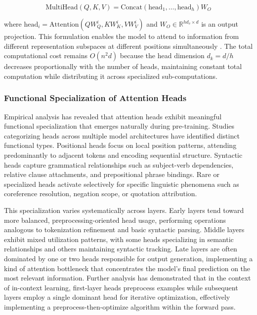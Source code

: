 \documentclass[11pt,letterpaper]{article}
\begin{document}
\begin{equation}
\text{MultiHead}(Q, K, V) = \text{Concat}(\text{head}_1, \ldots, \text{head}_h) W_O
\end{equation}

where $\text{head}_i = \text{Attention}(QW_Q^i, KW_K^i, VW_V^i)$ and $W_O \in \mathbb{R}^{hd_v \times d}$ is an output projection. This formulation enables the model to attend to information from different representation subspaces at different positions simultaneously \cite{vaswani2017attention}. The total computational cost remains $O(n^2 d)$ because the head dimension $d_k = d/h$ decreases proportionally with the number of heads, maintaining constant total computation while distributing it across specialized sub-computations.

\subsubsection{Functional Specialization of Attention Heads}

Empirical analysis has revealed that attention heads exhibit meaningful functional specialization that emerges naturally during pre-training. Studies categorizing heads across multiple model architectures have identified distinct functional types. Positional heads focus on local position patterns, attending predominantly to adjacent tokens and encoding sequential structure. Syntactic heads capture grammatical relationships such as subject-verb dependencies, relative clause attachments, and prepositional phrase bindings. Rare or specialized heads activate selectively for specific linguistic phenomena such as coreference resolution, negation scope, or quotation attribution.

This specialization varies systematically across layers. Early layers tend toward more balanced, preprocessing-oriented head usage, performing operations analogous to tokenization refinement and basic syntactic parsing. Middle layers exhibit mixed utilization patterns, with some heads specializing in semantic relationships and others maintaining syntactic tracking. Late layers are often dominated by one or two heads responsible for output generation, implementing a kind of attention bottleneck that concentrates the model's final prediction on the most relevant information. Further analysis has demonstrated that in the context of in-context learning, first-layer heads preprocess examples while subsequent layers employ a single dominant head for iterative optimization, effectively implementing a preprocess-then-optimize algorithm within the forward pass.
\end{document}
